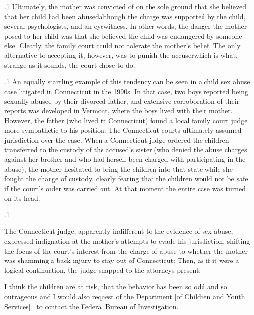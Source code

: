 \documentclass[11pt, twoside]{article}
\begin{document}
{\p.1{%
Ultimately, the mother was convicted of  on the sole ground
that she believed that her child had been abused\mdash{}although the charge
was supported by the child, several psychologists, and an eyewitness.
In other words, the danger the mother posed to her child was that she
believed the child was endangered by someone else. Clearly, the family
court could not tolerate the mother’s belief. The only alternative to accepting it, however, was to punish the accuser\mdash{}which is what, strange
as it sounds, the court chose to do.
}%

\p.1{%
An equally startling example of this tendency can be seen in a child
sex abuse case litigated in Connecticut in the 1990s. In that case, two
boys reported being sexually abused by their divorced father, and extensive corroboration of their reports was developed in Vermont, where
the boys lived with their mother. However, the father (who lived in
Connecticut) found a local family court judge more sympathetic to his
position. The Connecticut courts ultimately assumed jurisdiction over
the case. When a Connecticut judge ordered the children 
transferred to the custody of the accused’s sister (who denied the abuse
charges against her brother and who had herself been charged with participating in the abuse), the mother hesitated to bring the children into
that state while she fought the change of custody, clearly fearing that the
children would not be safe if the court’s order was carried out. At that
moment the entire case was turned on its head.
}%

\p.1{%
The Connecticut judge, apparently indifferent to the evidence of sex
abuse, expressed indignation at the mother’s attempts to evade his jurisdiction, shifting the focus of the court’s interest from the charge of abuse
to whether the mother was shamming a back injury to stay out of Connecticut:  Then, as if it were a logical continuation, the
judge snapped to the attorneys present:

\begin{blockQuote}
I think the children are at risk, that the behavior has been so odd
and so outrageous and I would also request of the Department [of
Children and Youth Services] \ellThree{2pt}{2pt}\ to contact the Federal Bureau of
Investigation.
\end{blockQuote}

}}
\end{document}
